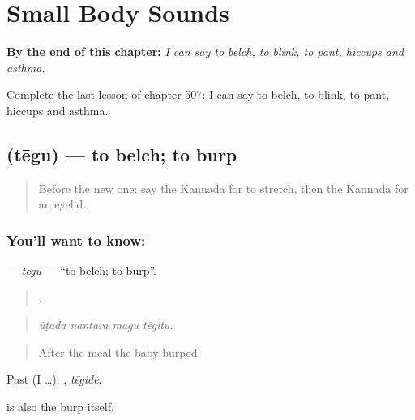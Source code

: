 
\chapter{Small Body Sounds}
\label{ch:ka-small-body-sounds}

\begin{chapteropening}
\textbf{By the end of this chapter:} \emph{I can say to belch, to blink, to pant, hiccups and asthma.}

Complete the last lesson of chapter 507: I can say to belch, to blink, to pant, hiccups and asthma.
\end{chapteropening}

\section[\texorpdfstring{\kn{ತೇಗು} (tēgu)}{ತೇಗು (tēgu)}]{ (tēgu) — to belch; to burp}

\label{lesson:KA-C507-tegu}



\begin{quote}
Before the new one: say the Kannada for to stretch, then the Kannada for an eyelid.
\end{quote}

\subsection*{You'll want to know: }
\textbf{} — \emph{tēgu} — \textquotedblleft{}to belch; to burp\textquotedblright{}.

\begin{quote}
   .
\end{quote}

\begin{quote}
\emph{ūṭada nantara magu tēgitu.}
\end{quote}

\begin{quote}
After the meal the baby burped.
\end{quote}

Past (I …): , \emph{tēgide}.

 is also the burp itself.

